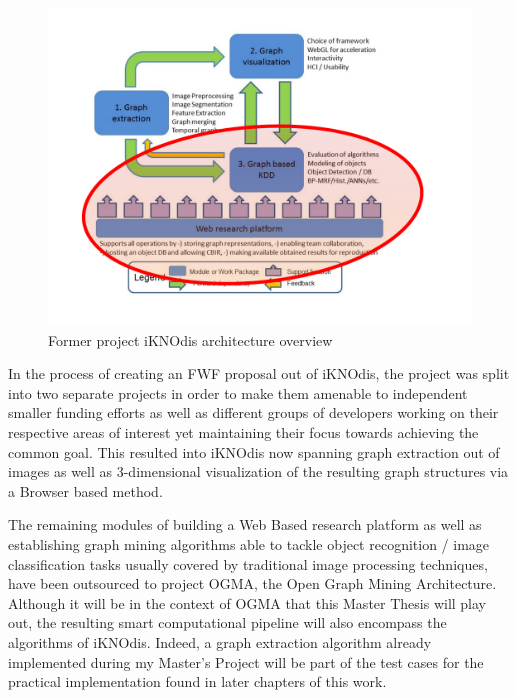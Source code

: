 \par

\begin{figure}[ht]
	\label{fig_iKNOdis_structure}
	\includegraphics[width=1.1\textwidth]{figures/iKNOdis_OGMA_structure}
	\caption{Former project iKNOdis architecture overview}
\end{figure}


In the process of creating an FWF proposal out of iKNOdis, the project was split into two separate projects in order to make them amenable to independent smaller funding efforts as well as different groups of developers working on their respective areas of interest yet maintaining their focus towards achieving the common goal. This resulted into iKNOdis now spanning graph extraction out of images as well as 3-dimensional visualization of the resulting graph structures via a Browser based method. 

The remaining modules of building a Web Based research platform as well as establishing graph mining algorithms able to tackle object recognition / image classification tasks usually covered by traditional image processing techniques, have been outsourced to project OGMA, the Open Graph Mining Architecture. Although it will be in the context of OGMA that this Master Thesis will play out, the resulting smart computational pipeline will also encompass the algorithms of iKNOdis. Indeed, a graph extraction algorithm already implemented during my Master's Project \cite{GraphExtractPaper} will be part of the test cases for the practical implementation found in later chapters of this work. 



